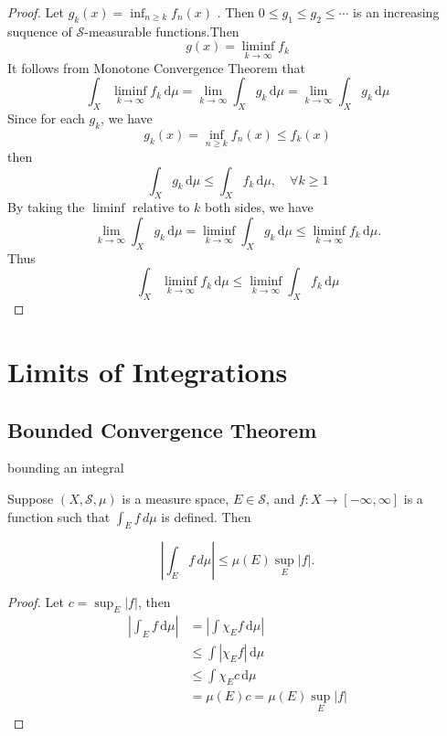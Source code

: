 \documentclass[../main.tex]{subfiles}
\begin{document}
\begin{proof}
    Let \(  g_{k}\left( x \right) = \inf _{n\ge k}f_{n}\left( x \right)   \) . Then \(  0\le g_1\le g_2\le \cdots   \) is an increasing suquence of \(  \mathcal{S}  \)-measurable functions.Then \[
    g\left( x \right)= \liminf_{k\to \infty}f_{k} 
    \]  It follows from Monotone Convergence Theorem that \[
  \int _{X}\liminf_{k\to \infty}f_{k}  \,\mathrm{d} \mu = \lim _{k\to \infty}\int_{X}g_{k}\,\mathrm{d} \mu = \lim_{k\to \infty} \int_{X} g_{k}\,\mathrm{d} \mu 
    \] Since for each \(  g_{k}  \), we have \[
    g_{k}\left( x \right)= \inf _{n\ge k}f_{n}\left( x \right)\le f_{k}\left( x \right)   
    \] then \[
    \int_{X}g_{k}\,\mathrm{d} \mu \le \int_{X}f_{k}\,\mathrm{d} \mu ,\quad \forall k\ge 1
    \] By taking the \(  \liminf   \) relative to \(  k  \) both sides, we have \[
    \lim_{k\to \infty}\int_{X}g_{k}\,\mathrm{d} \mu = \liminf_{k\to \infty}\int_{X}g_{k}\,\mathrm{d} \mu \le \liminf_{k\to \infty}f_{k}\,\mathrm{d} \mu .
    \] Thus \[
    \int_{X}\liminf_{k\to \infty}f_{k}\,\mathrm{d} \mu \le \liminf_{k\to \infty}\int_{X}f_{k}\,\mathrm{d} \mu 
    \]  
\end{proof}
\section{Limits of Integrations}

\subsection{Bounded Convergence Theorem}

\begin{proposition}{bounding an integral}{}
 
Suppose $(X, \mathcal{S}, \mu)$ is a measure space, $E \in \mathcal{S}$, and $f: X \to [-\infty, \infty]$ is a function such that $\int_E f \, d\mu$ is defined. Then
 
\[
\left| \int_E f \, d\mu \right| \leq \mu(E) \sup_E |f|.
\]
 
\end{proposition}
\begin{proof}
    Let \(  c= \sup _{E}\left| f \right|   \), then \[
    \begin{aligned}
    \left| \int_{E}f\,\mathrm{d} \mu  \right|&= \left|  \int \chi _{E}f \,\mathrm{d} \mu  \right|\\ 
     &\le \int \left| \chi _{E}f \right|\,\mathrm{d} \mu \\ 
      &\le  \int \chi _{E}c\,\mathrm{d} \mu \\ 
       &= \mu \left( E \right)c= \mu \left( E \right)\sup _{E}\left| f \right|       
    \end{aligned}
    \] 
\end{proof}
\end{document}
